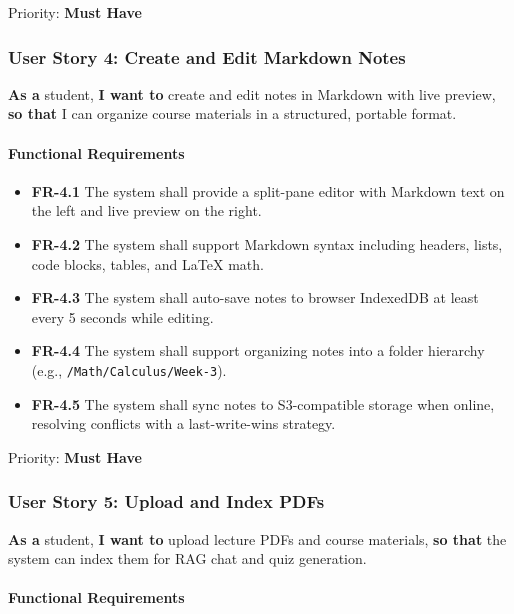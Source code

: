 \documentclass[12pt,a4paper]{article}
\begin{document}
Priority: \textbf{Must Have}

\subsubsection{User Story 4: Create and Edit Markdown Notes}

\textbf{As a} student, \textbf{I want to} create and edit notes in Markdown with live preview, \textbf{so that} I can organize course materials in a structured, portable format.

\paragraph{Functional Requirements}

\begin{itemize}
    \item \textbf{FR-4.1} The system shall provide a split-pane editor with Markdown text on the left and live preview on the right.
    \item \textbf{FR-4.2} The system shall support Markdown syntax including headers, lists, code blocks, tables, and LaTeX math.
    \item \textbf{FR-4.3} The system shall auto-save notes to browser IndexedDB at least every 5 seconds while editing.
    \item \textbf{FR-4.4} The system shall support organizing notes into a folder hierarchy (e.g., \texttt{/Math/Calculus/Week-3}).
    \item \textbf{FR-4.5} The system shall sync notes to S3-compatible storage when online, resolving conflicts with a last-write-wins strategy.
\end{itemize}

Priority: \textbf{Must Have}

\subsubsection{User Story 5: Upload and Index PDFs}

\textbf{As a} student, \textbf{I want to} upload lecture PDFs and course materials, \textbf{so that} the system can index them for RAG chat and quiz generation.

\paragraph{Functional Requirements}
\end{document}
